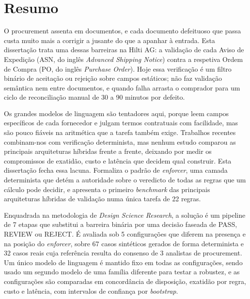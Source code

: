 \chapter*{Resumo}

O procurement assenta em documentos, e cada documento defeituoso que passa custa muito mais a corrigir a jusante do que a apanhar à entrada. Esta dissertação trata uma dessas barreiras na Hilti AG: a validação de cada Aviso de Expedição (ASN, do inglês \emph{Advanced Shipping Notice}) contra a respetiva Ordem de Compra (PO, do inglês \emph{Purchase Order}). Hoje essa verificação é um filtro binário de aceitação ou rejeição sobre campos estáticos; não faz validação semântica nem entre documentos, e quando falha arrasta o comprador para um ciclo de reconciliação manual de 30 a 90 minutos por defeito.

Os grandes modelos de linguagem são tentadores aqui, porque leem campos específicos de cada fornecedor e julgam termos contratuais com facilidade, mas são pouco fiáveis na aritmética que a tarefa também exige. Trabalhos recentes combinam-nos com verificação determinista, mas nenhum estudo comparou as principais arquiteturas híbridas frente a frente, deixando por medir os compromissos de exatidão, custo e latência que decidem qual construir. Esta dissertação fecha essa lacuna. Formaliza o padrão de \emph{enforcer}, uma camada determinista que detém a autoridade sobre o veredicto de todas as regras que um cálculo pode decidir, e apresenta o primeiro \emph{benchmark} das principais arquiteturas híbridas de validação numa única tarefa de 22 regras.

Enquadrada na metodologia de \emph{Design Science Research}, a solução é um pipeline de 7 etapas que substitui a barreira binária por uma decisão faseada de PASS, REVIEW ou REJECT. É avaliada sob 5 configurações que diferem na presença e na posição do \emph{enforcer}, sobre 67 casos sintéticos gerados de forma determinista e 32 casos reais cuja referência resulta do consenso de 3 analistas de procurement. Um único modelo de linguagem é mantido fixo em todas as configurações, sendo usado um segundo modelo de uma família diferente para testar a robustez, e as configurações são comparadas em concordância de disposição, exatidão por regra, custo e latência, com intervalos de confiança por \emph{bootstrap}.

